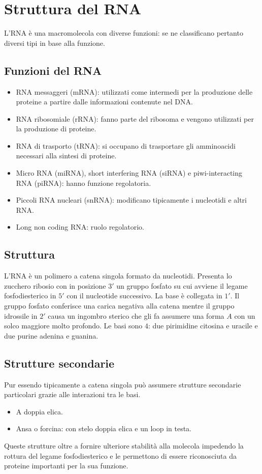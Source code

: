 \section{Struttura del RNA}
L'RNA \`e una macromolecola con diverse funzioni: se ne classificano pertanto diversi tipi in base alla funzione.

	\subsection{Funzioni del RNA}
	\begin{multicols}{2}
		\begin{itemize}
			\item RNA messaggeri (mRNA): utilizzati come intermedi per la produzione delle proteine a partire dalle informazioni contenute nel DNA.
			\item RNA ribosomiale (rRNA): fanno parte del ribosoma e vengono utilizzati per la produzione di proteine.
			\item RNA di trasporto (tRNA): si occupano di trasportare gli amminoacidi necessari alla sintesi di proteine.
			\item Micro RNA (miRNA), short interfering RNA (siRNA) e piwi-interacting RNA (piRNA): hanno funzione regolatoria.
			\item Piccoli RNA nucleari (snRNA): modificano tipicamente i nucleotidi e altri RNA.
			\item Long non coding RNA: ruolo regolatorio. 
		\end{itemize}
	\end{multicols}

	\subsection{Struttura}
	L'RNA \`e un polimero a catena singola formato da nucleotidi. 
	Presenta lo zucchero ribosio con in posizione $3'$ un gruppo fosfato su cui avviene il legame fosfodiesterico in $5'$ con il
	nucleotide successivo. 
	La base \`e collegata in $1'$. 
	Il gruppo fosfato conferisce una carica negativa alla catena mentre il gruppo idrossile in $2'$ causa un ingombro sterico che gli fa assumere una forma $A$ con un solco maggiore molto profondo. 
	Le basi sono $4$: due pirimidine citosina e uracile e due purine adenina e guanina. 

	\subsection{Strutture secondarie}
	Pur essendo tipicamente a catena singola pu\`o assumere strutture secondarie particolari grazie alle interazioni tra le basi. 
	\begin{multicols}{2}
		\begin{itemize}
		\item A doppia elica.
		\item Ansa o forcina: con stelo doppia elica e un loop in testa.
	\end{itemize}
	\end{multicols}
	Queste strutture oltre a fornire ulteriore stabilit\`a alla molecola impedendo la rottura del legame fosfodiesterico e le permettono di essere riconosciuta da proteine importanti per la sua funzione. 

